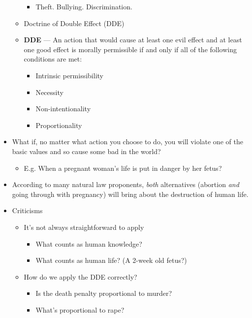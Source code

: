 \documentclass{article}
\begin{document}
\begin{spacing}{1.2}
\begin{itemize}
\begin{itemize}
                \begin{itemize}
                    \item Theft. Bullying. Discrimination.
                \end{itemize}
                \item Doctrine of Double Effect (DDE)
                \item \textbf{DDE} --- An action that would cause at least one evil effect and at least one good effect is morally permissible if and only if all of the following conditions are met:
                \begin{itemize}
                    \item Intrinsic permissibility
                    \item Necessity
                    \item Non-intentionality
                    \item Proportionality
                \end{itemize}
            \end{itemize}
            \item What if, no matter what action you choose to do, you will violate one of the basic values and so cause some bad in the world?
            \begin{itemize}
                \item E.g. When a pregnant woman's life is put in danger by her fetus?
            \end{itemize}
            \item According to many natural law proponents, \emph{both} alternatives (abortion \emph{and} going through with pregnancy) will bring about the destruction of human life.
            \item Criticisms
            \begin{itemize}
                \item It's not always straightforward to apply
                \begin{itemize}
                    \item What counts as human knowledge?
                    \item What counts as human life? (A 2-week old fetus?)
                \end{itemize}
                \item How do we apply the DDE correctly?
                \begin{itemize}
                    \item Is the death penalty proportional to murder?
                    \item What's proportional to rape?
                \end{itemize}
            \end{itemize}
        \end{itemize}

\end{spacing}
\end{document}
